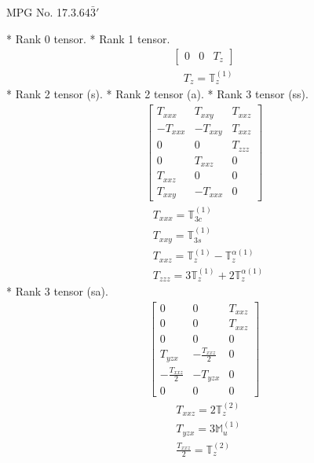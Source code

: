 \documentclass[fleqn,8pt,landscape]{jsarticle}
\begin{document}
\setcounter{MaxMatrixCols}{32}

\renewcommand{\tablename}{Table~}
\renewcommand{\figurename}{Figure~}
\begin{center}
\LARGE
MPG No. 17.3.64\quad$\bar{3}'$
\end{center}
* Rank 0 tensor.
* Rank 1 tensor.
\begin{align*}
\begin{bmatrix} 0 & 0 & T_{z} \end{bmatrix}
\end{align*}
\begin{align*}
& T_{z} = \mathbb{T}_{z}^{(1)}
\end{align*}
* Rank 2 tensor (s).
* Rank 2 tensor (a).
* Rank 3 tensor (ss).
\begin{align*}
\begin{bmatrix} T_{xxx} & T_{xxy} & T_{xxz} \\ - T_{xxx} & - T_{xxy} & T_{xxz} \\ 0 & 0 & T_{zzz} \\ 0 & T_{xxz} & 0 \\ T_{xxz} & 0 & 0 \\ T_{xxy} & - T_{xxx} & 0 \end{bmatrix}
\end{align*}
\begin{align*}
& T_{xxx} = \mathbb{T}_{3c}^{(1)} \\
& T_{xxy} = \mathbb{T}_{3s}^{(1)} \\
& T_{xxz} = \mathbb{T}_{z}^{(1)} - \mathbb{T}_{z}^{\alpha(1)} \\
& T_{zzz} = 3 \mathbb{T}_{z}^{(1)} + 2 \mathbb{T}_{z}^{\alpha(1)}
\end{align*}
* Rank 3 tensor (sa).
\begin{align*}
\begin{bmatrix} 0 & 0 & T_{xxz} \\ 0 & 0 & T_{xxz} \\ 0 & 0 & 0 \\ T_{yzx} & - \frac{T_{xxz}}{2} & 0 \\ - \frac{T_{xxz}}{2} & - T_{yzx} & 0 \\ 0 & 0 & 0 \end{bmatrix}
\end{align*}
\begin{align*}
& T_{xxz} = 2 \mathbb{T}_{z}^{(2)} \\
& T_{yzx} = 3 \mathbb{M}_{u}^{(1)} \\
& \frac{T_{xxz}}{2} = \mathbb{T}_{z}^{(2)}
\end{align*}
\end{document}
